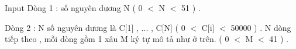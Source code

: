 Input
Dòng 1 : số nguyên dương N ( 0 $<$ N $<$ 51 ) .   


   Dòng 2 : N số nguyên dương là C[1] , ... , C[N] ( 0 $<$ C[i] $<$ 50000 ) . N dòng tiếp theo , mỗi dòng gồm 1 xâu M ký tự mô tả như ở trên. ( 0 $<$ M $<$ 41 ) .